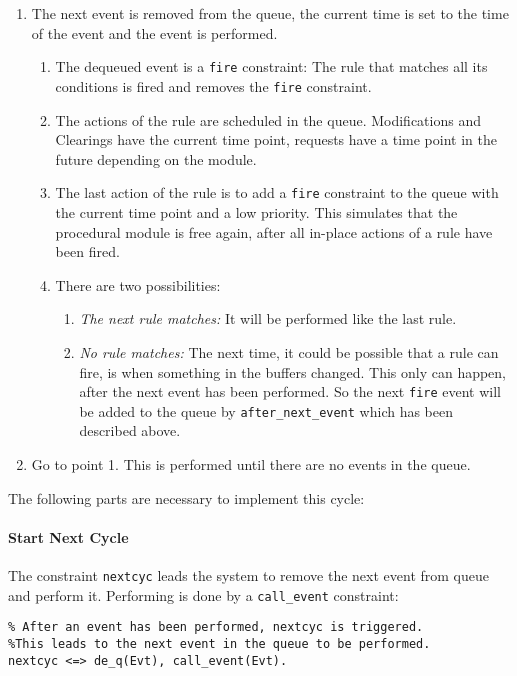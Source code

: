 \begin{enumerate}
 \item The next event is removed from the queue, the current time is set to the time of the event and the event is performed.
 \begin{enumerate}
 \item The dequeued event is a \verb|fire| constraint: The rule that matches all its conditions is fired and removes the \verb|fire| constraint.
 \item The actions of the rule are scheduled in the queue. Modifications and Clearings have the current time point, requests have a time point in the future depending on the module.
 \item The last action of the rule is to add a \verb|fire| constraint to the queue with the current time point and a low priority. This simulates that the procedural module is free again, after all in-place actions of a rule have been fired.
 \item There are two possibilities:
 \begin{enumerate}
  \item \emph{The next rule matches:} It will be performed like the last rule.
  \item \emph{No rule matches:} The next time, it could be possible that a rule can fire, is when something in the buffers changed. This only can happen, after the next event has been performed. So the next \verb|fire| event will be added to the queue by \verb|after_next_event| which has been described above.
 \end{enumerate}
  \end{enumerate}
 \item Go to point 1. This is performed until there are no events in the queue.
\end{enumerate}


The following parts are necessary to implement this cycle:

\paragraph{Start Next Cycle} 

The constraint \verb|nextcyc| leads the system to remove the next event from queue and perform it. Performing is done by a \verb|call_event| constraint:

\begin{lstlisting}
% After an event has been performed, nextcyc is triggered. 
%This leads to the next event in the queue to be performed.
nextcyc <=> de_q(Evt), call_event(Evt).
\end{lstlisting}

